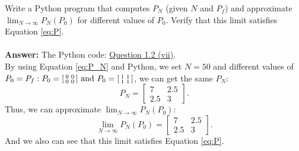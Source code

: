\documentclass[a4paper,11pt,reqno]{amsart}
\begin{document}
Write a Python program that computes $P_N$ (given $N$ and $P_f$) and approximate $\lim_{N\to \infty}P_N(P_0)$ for
different values of $P_0$. Verify that this limit satisfies Equation \eqref{eq:P}.
\\ \\
\textbf{Answer:} 
The Python code: \href{https://github.com/Gczmy/ELE8088/blob/main/Coursework1/Python_code/2_vii.py}{Question 1.2 (vii)}.
\\
By using Equation \eqref{eq:P_N} and Python, we set $N=50$ and different values of $P_0=P_f:P_0=\begin{bsmallmatrix}0&0\\0&0\end{bsmallmatrix}\text{ and }P_0=\begin{bsmallmatrix}1&1\\1&1\end{bsmallmatrix}$, we can get the same $P_N$:
\begin{equation}
    P_N=
    \begin{bmatrix}
        7&2.5\\
        2.5&3
    \end{bmatrix}.
\end{equation}
Thus, we can approximate $\lim_{N\to \infty}P_N(P_0)$:
\begin{equation}
    \lim_{N\to \infty}P_N(P_0)=
    \begin{bmatrix}
        7&2.5\\
        2.5&3
    \end{bmatrix}.
\end{equation}
And we also can see that this limit satisfies Equation \eqref{eq:P}.

\end{document}
